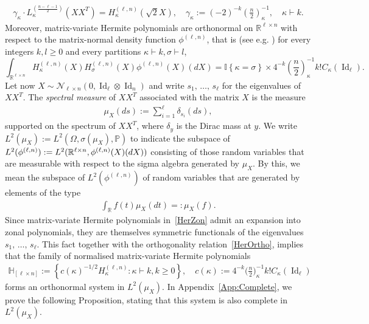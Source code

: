 \documentclass[AHL,Unicode,longabstracts,published]{cedram}
\DeclareMathOperator{\Id}{Id}
\newcommand{\scN}{\mathscr{N}}
\newcommand{\R}{\mathbb{R}}
\newcommand{\bbH}{\mathbb{H}}
\newcommand{\Prob}{\mathbb{P}}
\newcommand{\ind}[1]{\mathbb{I}
\left\{#1\right\}}
\begin{document}
\begin{gather}\label{RelHerLag}
\gamma_{\kappa}\cdot L_{\kappa}^{\left(\frac{n-\ell-1}{2}\right)}\left(XX^T\right) = H^{(\ell,n)}_{\kappa}\left(\sqrt{2}X\right), \quad \gamma_{\kappa}:=(-2)^{-k} \left(\frac{n}{2}\right)_{\kappa}^{-1}, \quad \kappa \vdash k.
\end{gather}
Moreover, matrix-variate Hermite polynomials are orthonormal on $\R^{\ell \times n}$ with respect to the matrix-normal density function $\phi^{(\ell,n)}$, that is (see e.g. \cite[Corollary~3]{Hay}) for every integers $k,l\geq0$ and every partitions $\kappa \vdash k,\sigma \vdash l$,
\begin{equation}\label{HerOrtho}
\int_{\R^{\ell \times n}} H_{\kappa}^{(\ell,n)}(X) H_{\sigma}^{(\ell,n)}(X) \phi^{(\ell,n)}(X) (dX) = \ind{\kappa=\sigma} \times 4^{-k}\left(\frac{n}{2}\right)_{\kappa}^{-1} k !C_{\kappa}(\Id_{\ell}).
\end{equation}
Let now $X \sim \scN_{\ell \times n}(0,\Id_{\ell}\otimes\Id_n)$ and write $s_1,\,\ldots,\,s_{\ell}$ for the eigenvalues of\linebreak $XX^T$. The \emph{spectral measure} of $XX^T$ associated with the matrix $X$ is the measure
\begin{gather*}
\mu_X(ds):=\sum_{i =1}^{\ell} \delta_{s_i}(ds),
\end{gather*}
supported on the spectrum of $XX^T$, where $\delta_y$ is the Dirac mass at $y$. We write $L^2(\mu_X):=L^2(\Omega,\sigma(\mu_X),\Prob)$ to indicate the subspace of $L^2(\phi^{(\ell,n)}):=L^2(\R^{\ell \times n}, \phi^{(\ell,n)}\linebreak(X)(dX))$ consisting of those random variables that are measurable with respect to the sigma algebra generated by $\mu_X$. By this, we mean the subspace of $L^2(\phi^{(\ell,n)})$ of random variables that are generated by elements of the type
\begin{gather}\label{F}
\int_{\R } f(t) \mu_X(dt) =: \mu_X(f).
\end{gather}
Since matrix-variate Hermite polynomials in~\eqref{HerZon} admit an expansion into zonal polynomials, they are themselves symmetric functionals of the eigenvalues $s_1,\,\ldots,\, s_{\ell} $. This fact together with the orthogonality relation~\eqref{HerOrtho}, implies that the family of normalised matrix-variate Hermite polynomials
\begin{gather}\label{HerONB}
\bbH_{[\ell \times n]}:=\left\{ c(\kappa)^{-1/2} H_{\kappa}^{(\ell,n)} : \kappa \vdash k, k \geq 0 \right\}, \quad c(\kappa):=4^{-k}\bigg(\frac{n}{2}\bigg)_{\kappa}^{-1} k !C_{\kappa}(\Id_{\ell})
\end{gather}
forms an orthonormal system in $L^2(\mu_X)$. In Appendix~\ref{App:Complete}, we prove the following Proposition, stating that this system is also complete in $L^2(\mu_X)$.
\end{document}
